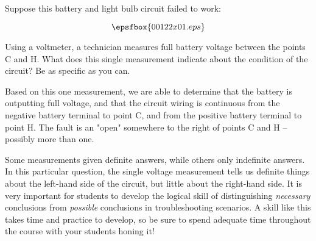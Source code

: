 

Suppose this battery and light bulb circuit failed to work:

$$\epsfbox{00122x01.eps}$$

Using a voltmeter, a technician measures full battery voltage between the points C and H.  What does this single measurement indicate about the condition of the circuit?  Be as specific as you can.







Based on this one measurement, we are able to determine that the battery is outputting full voltage, and that the circuit wiring is continuous from the negative battery terminal to point C, and from the positive battery terminal to point H.  The fault is an "open" somewhere to the right of points C and H -- possibly more than one.







Some measurements given definite answers, while others only indefinite answers.  In this particular question, the single voltage measurement tells us definite things about the left-hand side of the circuit, but little about the right-hand side.  It is very important for students to develop the logical skill of distinguishing {\it necessary} conclusions from {\it possible} conclusions in troubleshooting scenarios.  A skill like this takes time and practice to develop, so be sure to spend adequate time throughout the course with your students honing it!





